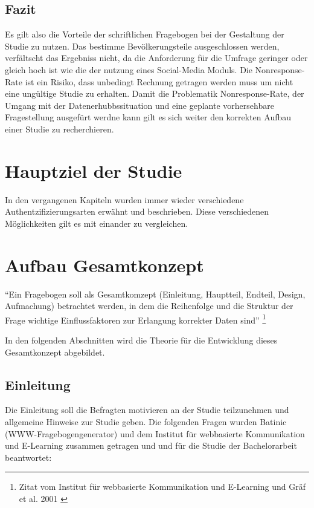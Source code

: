 \subsection{Fazit}\label{fazit}

Es gilt also die Vorteile der schriftlichen Fragebogen bei der
Gestaltung der Studie zu nutzen. Das bestimme Bevölkerungsteile
ausgeschlossen werden, verfältscht das Ergebniss nicht, da die
Anforderung für die Umfrage geringer oder gleich hoch ist wie die der
nutzung eines Social-Media Moduls. Die Nonresponse-Rate ist ein Risiko,
dass unbedingt Rechnung getragen werden muss um nicht eine ungültige
Studie zu erhalten. Damit die Problematik Nonresponse-Rate, der Umgang
mit der Datenerhubbssituation und eine geplante vorhersehbare
Fragestellung ausgefürt werdne kann gilt es sich weiter den korrekten
Aufbau einer Studie zu recherchieren.

\newpage

\section{Hauptziel der Studie}\label{hauptziel-der-studie}

In den vergangenen Kapiteln wurden immer wieder verschiedene
Authentzifizierungsarten erwähnt und beschrieben. Diese verschiedenen
Möglichkeiten gilt es mit einander zu vergleichen.

\section{Aufbau Gesamtkonzept}\label{aufbau-gesamtkonzept}

``Ein Fragebogen soll als Gesamtkomzept (Einleitung, Hauptteil, Endteil,
Design, Aufmachung) betrachtet werden, in dem die Reihenfolge und die
Struktur der Frage wichtige Einflussfaktoren zur Erlangung korrekter
Daten sind'' \footnote{Zitat vom Institut für webbasierte Kommunikation
  und E-Learning und Gräf et al. 2001 \autocite{fragebogen}}

In den folgenden Abschnitten wird die Theorie für die Entwicklung dieses
Gesamtkonzept abgebildet.

\subsection{Einleitung}\label{einleitung}

Die Einleitung soll die Befragten motivieren an der Studie teilzunehmen
und allgemeine Hinweise zur Studie geben. Die folgenden Fragen wurden
Batinic (WWW-Fragebogengenerator) und dem Institut für webbasierte
Kommunikation und E-Learning zusammen getragen und und für die Studie
der Bachelorarbeit beantwortet:

